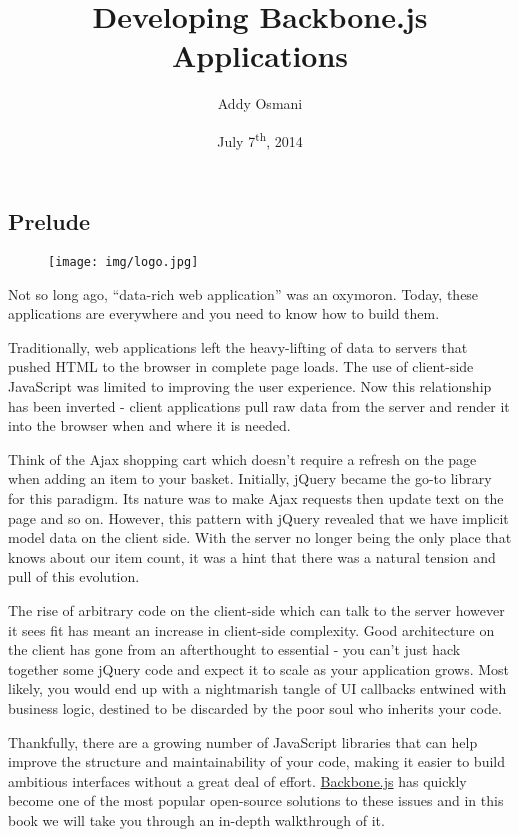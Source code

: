 \documentclass[9pt]{book}
\title{Developing Backbone.js Applications}
\author{Addy Osmani }
\date{July 7\textsuperscript{th}, 2014}
\begin{document}
\maketitle


{
\hypersetup{linkcolor=black}
\setcounter{tocdepth}{3}
\tableofcontents
}
\subsection{Prelude}\label{prelude}

\begin{figure}[htbp]
\centering
\texttt{[image: img/logo.jpg]}
\end{figure}

Not so long ago, ``data-rich web application'' was an oxymoron. Today,
these applications are everywhere and you need to know how to build
them.

Traditionally, web applications left the heavy-lifting of data to
servers that pushed HTML to the browser in complete page loads. The use
of client-side JavaScript was limited to improving the user experience.
Now this relationship has been inverted - client applications pull raw
data from the server and render it into the browser when and where it is
needed.

Think of the Ajax shopping cart which doesn't require a refresh on the
page when adding an item to your basket. Initially, jQuery became the
go-to library for this paradigm. Its nature was to make Ajax requests
then update text on the page and so on. However, this pattern with
jQuery revealed that we have implicit model data on the client side.
With the server no longer being the only place that knows about our item
count, it was a hint that there was a natural tension and pull of this
evolution.

The rise of arbitrary code on the client-side which can talk to the
server however it sees fit has meant an increase in client-side
complexity. Good architecture on the client has gone from an
afterthought to essential - you can't just hack together some jQuery
code and expect it to scale as your application grows. Most likely, you
would end up with a nightmarish tangle of UI callbacks entwined with
business logic, destined to be discarded by the poor soul who inherits
your code.

Thankfully, there are a growing number of JavaScript libraries that can
help improve the structure and maintainability of your code, making it
easier to build ambitious interfaces without a great deal of effort.
\href{http://documentcloud.github.com/backbone/}{Backbone.js} has
quickly become one of the most popular open-source solutions to these
issues and in this book we will take you through an in-depth walkthrough
of it.
\end{document}

